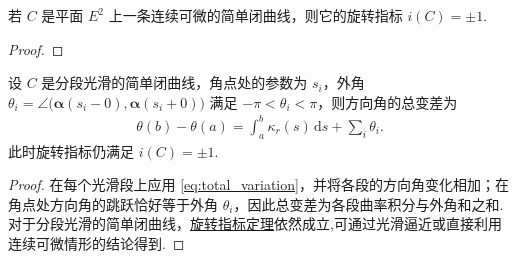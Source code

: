 \documentclass[../../main.tex]{subfiles}%
\begin{document}
\begin{theorem}[旋转指标定理]\label{theorem:旋转指标定理}
若 $C$ 是平面 $E^2$ 上一条连续可微的简单闭曲线，则它的旋转指标 $i(C)=\pm 1$.
\end{theorem}
\begin{proof}

\end{proof}

\begin{proposition}[分段光滑简单闭曲线的旋转指标]
设 $C$ 是分段光滑的简单闭曲线，角点处的参数为 $s_i$，外角 $\theta_i=\angle\bigl(\bm{\alpha}(s_i-0),\bm{\alpha}(s_i+0)\bigr)$ 满足 $-\pi<\theta_i<\pi$，则方向角的总变差为
\begin{align}
\theta(b)-\theta(a)=\int_a^b \kappa_r(s)\,\mathrm{d}s+\sum_i \theta_i. \label{eq:piecewise_total_variation}
\end{align}
此时旋转指标仍满足 $i(C)=\pm 1$.
\end{proposition}
\begin{proof}
在每个光滑段上应用 \eqref{eq:total_variation}，并将各段的方向角变化相加；在角点处方向角的跳跃恰好等于外角 $\theta_i$，因此总变差为各段曲率积分与外角和之和. 对于分段光滑的简单闭曲线，\hyperref[theorem:旋转指标定理]{旋转指标定理}依然成立,可通过光滑逼近或直接利用连续可微情形的结论得到.
\end{proof}
\end{document}
